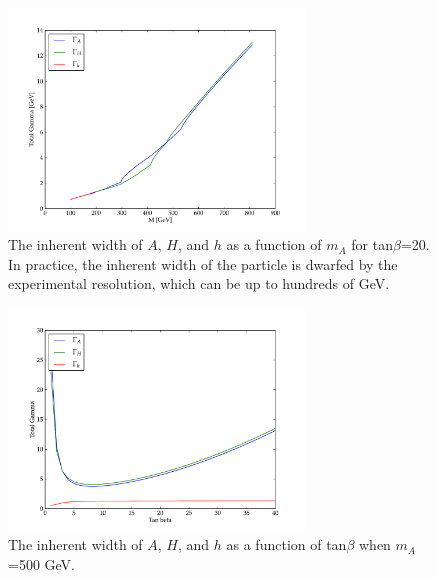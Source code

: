 \begin{figure}
	\centering
	\includegraphics[width=0.7\textwidth]{Theory/figures/gamma.pdf}
	\caption{The inherent width of $A$, $H$, and $h$ as a function of $m_A$ for tan$\beta$=20.  In practice, the inherent width of the particle is dwarfed by the experimental resolution, which can be up to hundreds of GeV.  \label{fig:width}}
\end{figure}



\begin{figure}
	\centering
	\includegraphics[width=0.7\textwidth]{Theory/figures/TB_gamma.pdf}
	\caption{The inherent width of $A$, $H$, and $h$ as a function of tan$\beta$ when $m_A$=500 GeV. \label{fig:TB_width}}
\end{figure}



